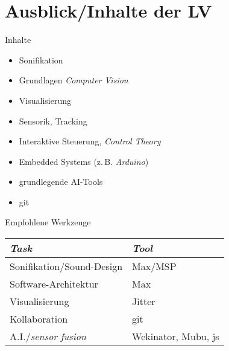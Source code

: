 \section{Ausblick/Inhalte der LV}
 \frame{\sectionpage}

 \begin{frame}{Inhalte}
 	\begin{itemize}
 		\item Sonifikation
 		\item Grundlagen \emph{Computer Vision}
	 	\item Visualisierung
	 	\item Sensorik, Tracking
                \item Interaktive Steuerung, \emph{Control Theory}
                \item Embedded Systems (z.\,B. \emph{Arduino})
	 	\item grundlegende AI-Tools
	 	\item git
 	\end{itemize}
 \end{frame}


 \begin{frame}{Empfohlene Werkzeuge}

\begin{table}[]
\begin{tabular}{l|l}
\emph{Task} 			  & \emph{Tool}			\\ \hline             
Sonifikation/Sound-Design   & Max/MSP             \\
Software-Architektur        & Max                 \\
Visualisierung              & Jitter              \\
Kollaboration               & git                 \\
A.I./\emph{sensor fusion}   & Wekinator, Mubu, js
\end{tabular}
\end{table}

 \end{frame}
